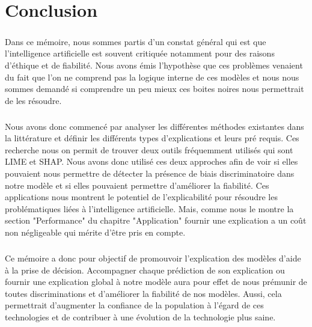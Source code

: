 \chapter*{Conclusion}

\paragraph{}Dans ce mémoire, nous sommes partis d'un constat général qui est que l'intelligence artificielle est souvent critiquée notamment pour des raisons d'éthique et de fiabilité. Nous avons émis l'hypothèse que ces problèmes venaient du fait que l'on ne comprend pas la logique interne de ces modèles et nous nous sommes demandé si comprendre un peu mieux ces boites noires nous permettrait de les résoudre.

\paragraph{}Nous avons donc commencé par analyser les différentes méthodes existantes dans la littérature et définir les différents types d'explications et leurs pré requis. Ces recherche nous on permit de trouver deux outils fréquemment utilisés qui sont LIME et SHAP. Nous avons donc utilisé ces deux approches afin de voir si elles pouvaient nous permettre de détecter la présence de biais discriminatoire dans notre modèle et si elles pouvaient permettre d'améliorer la fiabilité. Ces applications nous montrent le potentiel de l'explicabilité pour résoudre les problématiques liées à l'intelligence artificielle. Mais, comme nous le montre la section "Performance" du chapitre "Application" fournir une explication a un coût non négligeable qui mérite d'être pris en compte.

\paragraph{}Ce mémoire a donc pour objectif de promouvoir l'explication des modèles d'aide à la prise de décision. Accompagner chaque prédiction de son explication ou fournir une explication global à notre modèle aura pour effet de nous prémunir de toutes discriminations et d'améliorer la fiabilité de nos modèles. Aussi, cela permettrait d’augmenter la confiance de la population à l’égard de ces technologies et de contribuer à une évolution de la technologie plus saine.
